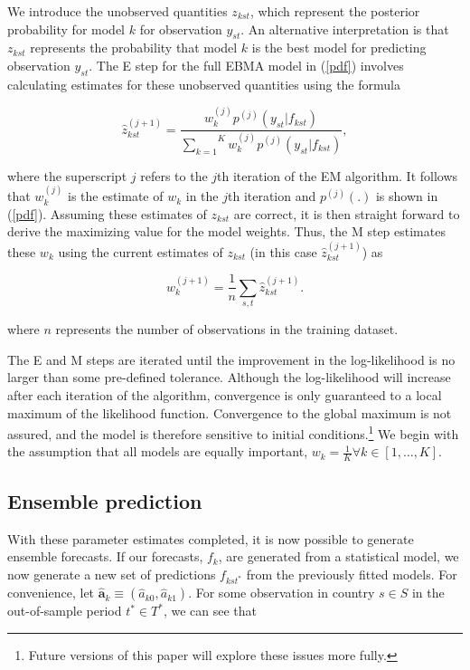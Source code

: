 \documentclass[pdftex,12pt,fullpage,oneside]{amsart}
\begin{document}
We introduce the unobserved quantities $z_{kst}$, which represent the
posterior probability for model $k$ for observation $y_{st}$. An
alternative interpretation is that $z_{kst}$ represents the
probability that model $k$ is the best model for predicting
observation $y_{st}$.  The E step for the full EBMA model in
(\ref{pdf}) involves calculating estimates for these unobserved
quantities using the formula

\begin{equation}
\hat{z}^{(j+1)}_{kst} = \frac{w^{(j)}_k
p^{(j)}(y_{st}|f_{kst})}{\overset{K}{\underset{k=1}{\sum}}w^{(j)}_kp^{(j)}(y_{st}|f_{kst})},
\end{equation}

\noindent where the superscript $j$ refers to the $j$th iteration of
the EM algorithm. It follows that $w_k^{(j)}$ is the estimate of $w_k$ in
the $j$th iteration and $p^{(j)}(.)$ is shown in (\ref{pdf}).
Assuming these estimates of $z_{kst}$ are correct, it is then straight
forward to derive the maximizing value for the model weights. Thus,
the M step estimates these $w_k$ using the current estimates of
$z_{kst}$ (in this case $\hat{z}^{(j+1)}_{kst}$) as

\begin{equation}
w^{(j+1)}_k=\frac{1}{n}\underset{s,t}{\sum}\hat{z}^{(j+1)}_{kst}.
\end{equation}

\noindent where $n$ represents the number of observations in the training dataset.  

The E and M steps are iterated until the improvement in the
log-likelihood is no larger than some pre-defined tolerance.  Although
the log-likelihood will increase after each iteration of the
algorithm, convergence is only guaranteed to a local maximum of the
likelihood function.  Convergence to the global maximum is not
assured, and the model is therefore sensitive to initial
conditions.\footnote{Future versions of this paper will explore these
  issues more fully.} We begin with the assumption that all models are
equally important, $w_k = \frac{1}{K} \forall k \in [1, \ldots, K]$.

\subsection{Ensemble prediction}

With these parameter estimates completed, it is now possible to
generate ensemble forecasts. If our forecasts, $f_k$, are generated
from a statistical model, we now generate a new set of predictions
$f_{kst^*}$ from the previously fitted models. For convenience, let
$\hat{\mathbf{a}}_k \equiv (\hat{a}_{k0}, \hat{a}_{k1})$. For some
observation in country $s\in S$ in the out-of-sample period $t^*\in
T^*$, we can see that
\end{document}
